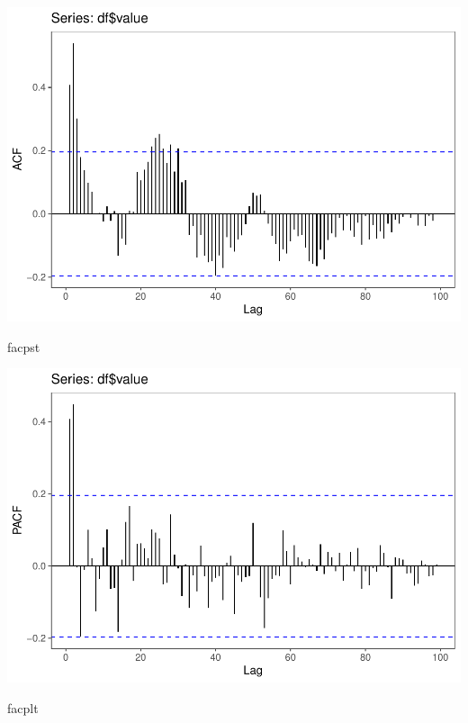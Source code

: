 \documentclass[]{article}
\newenvironment{Shaded}{\begin{snugshade}}{\end{snugshade}}
\newcommand{\NormalTok}[1]{#1}
\begin{document}
\includegraphics{Econo2_P4_files/figure-latex/plots-4.pdf}

\begin{Shaded}
\begin{Highlighting}[]
\NormalTok{facpst}
\end{Highlighting}
\end{Shaded}

\includegraphics{Econo2_P4_files/figure-latex/plots-5.pdf}

\begin{Shaded}
\begin{Highlighting}[]
\NormalTok{facplt}
\end{Highlighting}
\end{Shaded}
\end{document}
